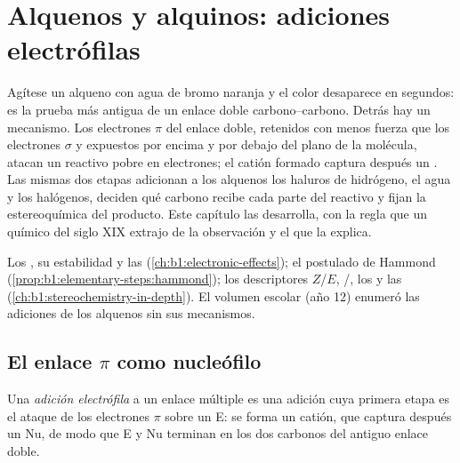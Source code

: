 \chapter{Alquenos y alquinos: adiciones electrófilas}\label{ch:b1:electrophilic-additions}

Agítese un alqueno con agua de bromo naranja y el color desaparece en
segundos: es la prueba más antigua de un enlace doble carbono--carbono.
Detrás hay un mecanismo. Los electrones $\pi$ del enlace doble, retenidos
con menos fuerza que los electrones $\sigma$ y expuestos por encima y por
debajo del plano de la molécula, atacan un reactivo pobre en electrones;
el catión formado captura después un . Las mismas dos etapas
adicionan a los alquenos los haluros de hidrógeno, el agua y los
halógenos, deciden qué carbono recibe cada parte del reactivo y fijan la
estereoquímica del producto. Este capítulo las desarrolla, con la regla
que un químico del siglo XIX extrajo de la observación y el 
que la explica.

\begin{recall}
Los , su estabilidad y las 
(\cref{ch:b1:electronic-effects}); el postulado de Hammond
(\cref{prop:b1:elementary-steps:hammond}); los descriptores $Z$/$E$,
/, los  y las 
(\cref{ch:b1:stereochemistry-in-depth}). El volumen escolar (año 12)
enumeró las adiciones de los alquenos sin sus mecanismos.
\end{recall}

\section{El enlace \texorpdfstring{$\pi$}{pi} como nucleófilo}

\begin{definition}\label{def:b1:electrophilic-additions:electrophilic-addition}
Una \emph{adición electrófila} a un
enlace múltiple es una adición cuya primera etapa es el ataque de los
electrones $\pi$ sobre un  E: se forma un catión, que captura
después un  Nu, de modo que E y Nu terminan en los dos carbonos
del antiguo enlace doble.
\end{definition}

